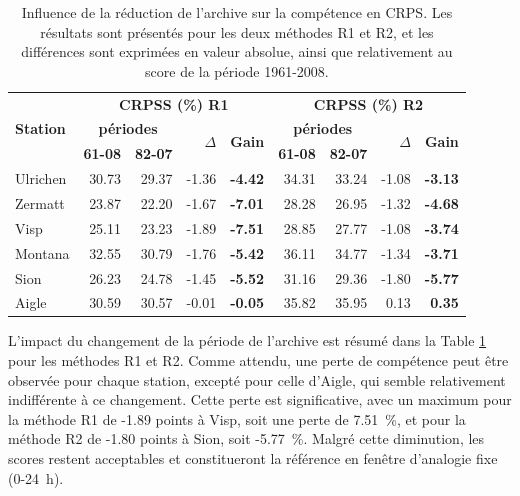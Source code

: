\documentclass[hess]{copernicus}
\begin{document}
\begin{table}[htb]
	\caption{Influence de la réduction de l'archive sur la compétence en CRPS. Les résultats sont présentés pour les deux méthodes R1 et R2, et les différences sont exprimées en valeur absolue, ainsi que relativement au score de la période 1961-2008.}
	\begin{center}
		\begin{tabular}{l r r r r r r r r}
			\hline
			\multirow{3}{*}{\textbf{Station}} & \multicolumn{ 4}{c}{\textbf{CRPSS (\%) R1}} & \multicolumn{ 4}{c}{\textbf{CRPSS (\%) R2}} \\
			& \multicolumn{ 2}{c}{\textbf{périodes}} & \multirow{2}{*}{\textbf{$\Delta$}} & \multirow{2}{*}{\textbf{Gain}} & \multicolumn{ 2}{c}{\textbf{périodes}} & \multirow{2}{*}{\textbf{$\Delta$}} & \multirow{2}{*}{\textbf{Gain}} \\
			& \multicolumn{1}{c}{\textbf{61-08}} & \multicolumn{1}{c}{\textbf{82-07}} &  &  & \textbf{61-08} & \textbf{82-07} &  &  \\ 
			\hline
			Ulrichen & 30.73 & 29.37 & -1.36 & \textbf{-4.42} & 34.31 & 33.24 & -1.08 & \textbf{-3.13} \\ \hline
			Zermatt & 23.87 & 22.20 & -1.67 & \textbf{-7.01} & 28.28 & 26.95 & -1.32 & \textbf{-4.68} \\ \hline
			Visp & 25.11 & 23.23 & -1.89 & \textbf{-7.51} & 28.85 & 27.77 & -1.08 & \textbf{-3.74} \\ \hline
			Montana & 32.55 & 30.79 & -1.76 & \textbf{-5.42} & 36.11 & 34.77 & -1.34 & \textbf{-3.71} \\ \hline
			Sion & 26.23 & 24.78 & -1.45 & \textbf{-5.52} & 31.16 & 29.36 & -1.80 & \textbf{-5.77} \\ \hline
			Aigle & 30.59 & 30.57 & -0.01 & \textbf{-0.05} & 35.82 & 35.95 & 0.13 & \textbf{0.35} \\ \hline
		\end{tabular}
	\end{center}
	\label{tab:fenetre_glissante:Pertes_CRPSS}
\end{table}

L'impact du changement de la période de l'archive est résumé dans la Table \ref{tab:fenetre_glissante:Pertes_CRPSS} pour les méthodes R1 et R2. Comme attendu, une perte de compétence peut être observée pour chaque station, excepté pour celle d'Aigle, qui semble relativement indifférente à ce changement. Cette perte est significative, avec un maximum pour la méthode R1 de -1.89 points à Visp, soit une perte de 7.51~\%, et pour la méthode R2 de -1.80 points à Sion, soit -5.77~\%. Malgré cette diminution, les scores restent acceptables et constitueront la référence en fenêtre d'analogie fixe (0-24~h).
\end{document}
